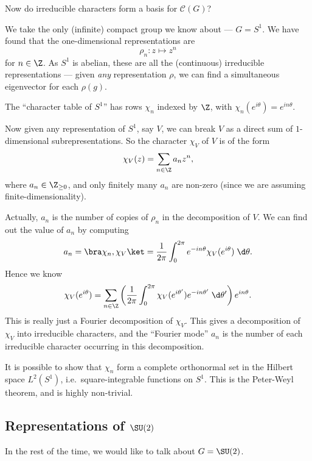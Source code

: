 \documentclass[a4paper]{article}
\begin{document}
Now do irreducible characters form a basis for $\mathcal{C}(G)$?
\begin{eg}
  We take the only (infinite) compact group we know about --- $G = S^1$. We have found that the one-dimensional representations are
  \[
    \rho_n: z \mapsto z^n
  \]
  for $n \in \Z$. As $S^1$ is abelian, these are all the (continuous) irreducible representations --- given \emph{any} representation $\rho$, we can find a simultaneous eigenvector for each $\rho(g)$.

  The ``character table of $S^1$'' has rows $\chi_n$ indexed by $\Z$, with $\chi_n(e^{i\theta}) = e^{in\theta}$.

  Now given any representation of $S^1$, say $V$, we can break $V$ as a direct sum of $1$-dimensional subrepresentations. So the character $\chi_V$ of $V$ is of the form
  \[
    \chi_V(z) = \sum_{n \in \Z} a_n z^n,
  \]
  where $a_n \in \Z_{\geq 0}$, and only finitely many $a_n$ are non-zero (since we are assuming finite-dimensionality).

  Actually, $a_n$ is the number of copies of $\rho_n$ in the decomposition of $V$. We can find out the value of $a_n$ by computing
  \[
    a_n = \bra \chi_n, \chi_V\ket = \frac{1}{2\pi} \int_0^{2\pi} e^{-in\theta}\chi_V(e^{i\theta})\;\d \theta.
  \]
  Hence we know
  \[
    \chi_V(e^{i\theta}) = \sum_{n \in \Z} \left(\frac{1}{2\pi} \int_0^{2\pi} \chi_V(e^{i\theta'}) e^{-in\theta'}\;\d \theta'\right) e^{in\theta}.
  \]
  This is really just a Fourier decomposition of $\chi_V$. This gives a decomposition of $\chi_V$ into irreducible characters, and the ``Fourier mode'' $a_n$ is the number of each irreducible character occurring in this decomposition.

  It is possible to show that $\chi_n$ form a complete orthonormal set in the Hilbert space $L^2(S^1)$, i.e.\ square-integrable functions on $S^1$. This is the Peter-Weyl theorem, and is highly non-trivial.
\end{eg}

\subsection{Representations of \texorpdfstring{$\SU(2)$}{SU(2)}}
In the rest of the time, we would like to talk about $G = \SU(2)$.
\end{document}
